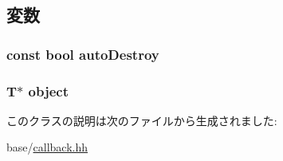 \subsection{変数}
\hypertarget{classMakeCallback_aec33737f5034d003937b7b09ba215585}{
\subsubsection[{autoDestroy}]{\setlength{\rightskip}{0pt plus 5cm}const bool {\bf autoDestroy}}}
\label{classMakeCallback_aec33737f5034d003937b7b09ba215585}
\hypertarget{classMakeCallback_acd5a12b9b1a75e37fd605accfe038a03}{
\subsubsection[{object}]{\setlength{\rightskip}{0pt plus 5cm}T$\ast$ {\bf object}}}
\label{classMakeCallback_acd5a12b9b1a75e37fd605accfe038a03}


このクラスの説明は次のファイルから生成されました:\begin{DoxyCompactItemize}
\item 
base/\hyperlink{callback_8hh}{callback.hh}\end{DoxyCompactItemize}
